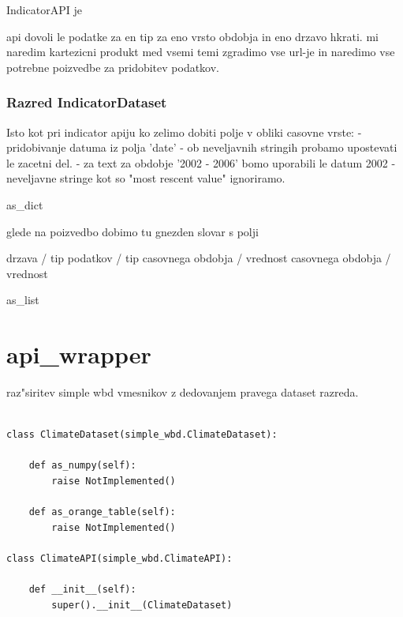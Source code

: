 IndicatorAPI je 


api dovoli le podatke za en tip za eno vrsto obdobja in eno drzavo hkrati.
mi naredim kartezicni produkt med vsemi temi zgradimo vse url-je in naredimo
vse potrebne poizvedbe za pridobitev podatkov.



\subsubsection{Razred IndicatorDataset}

Isto kot pri indicator apiju
ko zelimo dobiti polje v obliki casovne vrste:
 - pridobivanje datuma iz polja 'date'
   - ob neveljavnih stringih probamo upostevati le zacetni del.
     - za text za  obdobje  '2002 - 2006' bomo uporabili le datum 2002 
   - neveljavne stringe kot so "most rescent value" ignoriramo.




as\_dict 

glede na poizvedbo dobimo tu gnezden slovar s polji

drzava / tip podatkov / tip casovnega obdobja / vrednost casovnega obdobja / vrednost

as\_list

% 
% 



\section{api\_wrapper}



raz"siritev simple wbd vmesnikov z dedovanjem pravega dataset razreda.

\begin{verbatim}

class ClimateDataset(simple_wbd.ClimateDataset):
    
    def as_numpy(self):
        raise NotImplemented()
    
    def as_orange_table(self):
        raise NotImplemented()

class ClimateAPI(simple_wbd.ClimateAPI):

    def __init__(self):
        super().__init__(ClimateDataset)
\end{verbatim}



